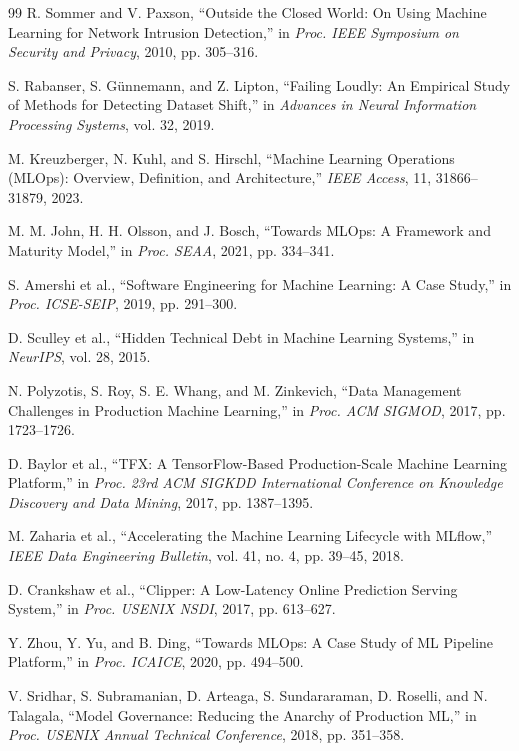 \documentclass[runningheads]{llncs}
\begin{document}
\begin{thebibliography}{99}
R. Sommer and V. Paxson,
``Outside the Closed World: On Using Machine Learning for Network Intrusion Detection,''
in \textit{Proc. IEEE Symposium on Security and Privacy}, 2010, pp. 305--316.

S. Rabanser, S. G\"unnemann, and Z. Lipton, ``Failing Loudly: An Empirical Study of Methods for Detecting Dataset Shift,'' in \textit{Advances in Neural Information Processing Systems}, vol. 32, 2019.

M. Kreuzberger, N. Kuhl, and S. Hirschl, ``Machine Learning Operations (MLOps): Overview, Definition, and Architecture,'' \textit{IEEE Access}, 11, 31866--31879, 2023.

M. M. John, H. H. Olsson, and J. Bosch, ``Towards MLOps: A Framework and Maturity Model,'' in \textit{Proc. SEAA}, 2021, pp. 334--341.

S. Amershi et al.,
``Software Engineering for Machine Learning: A Case Study,''
in \textit{Proc. ICSE-SEIP}, 2019, pp. 291--300.

D. Sculley et al.,
``Hidden Technical Debt in Machine Learning Systems,''
in \textit{NeurIPS}, vol. 28, 2015.

N. Polyzotis, S. Roy, S. E. Whang, and M. Zinkevich,
``Data Management Challenges in Production Machine Learning,''
in \textit{Proc. ACM SIGMOD}, 2017,
pp. 1723--1726.

D. Baylor et al.,
``TFX: A TensorFlow-Based Production-Scale Machine Learning Platform,''
in \textit{Proc. 23rd ACM SIGKDD International Conference on Knowledge Discovery and Data Mining},
2017, pp. 1387--1395.

M. Zaharia et al., ``Accelerating the Machine Learning Lifecycle with MLflow,'' \textit{IEEE Data Engineering Bulletin}, vol. 41, no. 4, pp. 39--45, 2018.

D. Crankshaw et al.,
``Clipper: A Low-Latency Online Prediction Serving System,''
in \textit{Proc. USENIX NSDI},
2017, pp. 613--627.

Y. Zhou, Y. Yu, and B. Ding, ``Towards MLOps: A Case Study of ML Pipeline Platform,'' in \textit{Proc. ICAICE}, 2020, pp. 494--500.

V. Sridhar, S. Subramanian, D. Arteaga, S. Sundararaman, D. Roselli, and N. Talagala, ``Model Governance: Reducing the Anarchy of Production ML,'' in \textit{Proc. USENIX Annual Technical Conference}, 2018, pp. 351--358.


\end{thebibliography}
\end{document}

